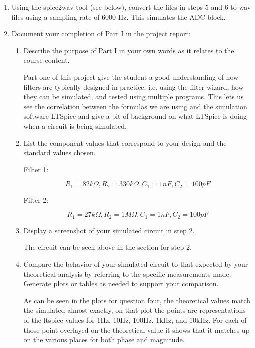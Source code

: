 \documentclass{article}
\begin{document}
\begin{enumerate}
    \item Using the spice2wav tool (see below), convert the files in steps 5 and 6 to wav files using a sampling rate of 6000 Hz. This simulates the ADC block.
    \item Document your completion of Part I in the project report:
    \begin{enumerate}
        \item Describe the purpose of Part I in your own words as it relates to the course content.
        \begin{center}
            Part one of this project give the student a good understanding of how filters are typically designed in practice, i.e. using the filter wizard, how they can be simulated, and tested using multiple programs. This lets us see the correlation between the formulas we are using and the simulation software LTSpice and give a bit of background on what LTSpice is doing when a circuit is being simulated.
        \end{center}
        \item List the component values that correspond to your design and the standard values chosen.
        \begin{center}
            Filter 1:
        \end{center}
        \begin{equation}
            R_1 = 82k\Omega, R_2 = 330k\Omega, C_1 = 1nF, C_2 = 100pF
        \end{equation}
        \begin{center}
            Filter 2:
        \end{center}
        \begin{equation}
            R_1 = 27k\Omega, R_2 = 1M\Omega, C_1 = 1nF, C_2 = 100pF
        \end{equation}
        \item Display a screenshot of your simulated circuit in step 2.
        \begin{center}
            The circuit can be seen above in the section for step 2.
        \end{center}
        \item Compare the behavior of your simulated circuit to that expected by your theoretical analysis by referring to the specific measurements made. Generate plots or tables as needed to support your comparison.
        \begin{center}
            As can be seen in the plots for question four, the theoretical values match the simulated almost exactly, on that plot the points are representations of the ltspice values for 1Hz, 10Hz, 100Hz, 1kHz, and 10kHz. For each of those point overlayed on the theoretical value it shows that it matches up on the various places for both phase and magnitude.

\end{center}
\end{enumerate}
\end{enumerate}
\end{document}
